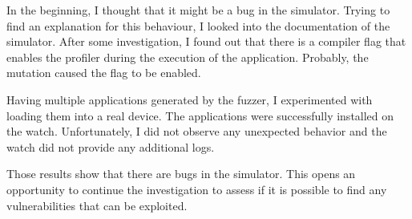 In the beginning, I thought that it might be a bug in the simulator.
Trying to find an explanation for this behaviour, I looked into the documentation of the simulator.
After some investigation, I found out that there is a compiler flag that enables the profiler during the execution of the application.
Probably, the mutation caused the flag to be enabled.

Having multiple applications generated by the fuzzer, I experimented with loading them into a real device.
The applications were successfully installed on the watch.
Unfortunately, I did not observe any unexpected behavior and the watch did not provide any additional logs.

Those results show that there are bugs in the simulator.
This opens an opportunity to continue the investigation to assess if it is possible to find any vulnerabilities that can be exploited.
